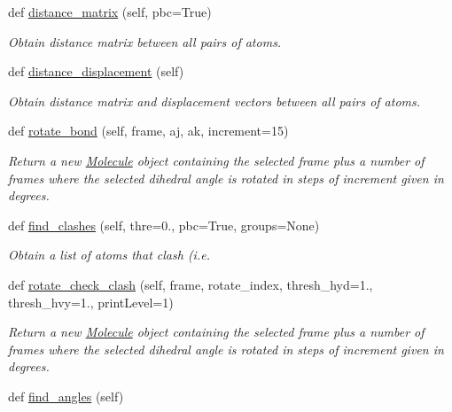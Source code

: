 \begin{DoxyCompactItemize}
def \hyperlink{classsrc_1_1molecule_1_1Molecule_ac9ca356c6a6ea6d5b470d819ab473f84}{distance\+\_\+matrix} (self, pbc=True)
\begin{DoxyCompactList}\small\item\em Obtain distance matrix between all pairs of atoms. \end{DoxyCompactList}\item 
def \hyperlink{classsrc_1_1molecule_1_1Molecule_a29b2035c5e476fb22707d6c17eaf5e3e}{distance\+\_\+displacement} (self)
\begin{DoxyCompactList}\small\item\em Obtain distance matrix and displacement vectors between all pairs of atoms. \end{DoxyCompactList}\item 
def \hyperlink{classsrc_1_1molecule_1_1Molecule_ae8aa53ace87ec66daf8264b2add069c3}{rotate\+\_\+bond} (self, frame, aj, ak, increment=15)
\begin{DoxyCompactList}\small\item\em Return a new \hyperlink{classsrc_1_1molecule_1_1Molecule}{Molecule} object containing the selected frame plus a number of frames where the selected dihedral angle is rotated in steps of \textquotesingle{}increment\textquotesingle{} given in degrees. \end{DoxyCompactList}\item 
def \hyperlink{classsrc_1_1molecule_1_1Molecule_a201a811c87574b4e229880540e4e6ef9}{find\+\_\+clashes} (self, thre=0., pbc=True, groups=None)
\begin{DoxyCompactList}\small\item\em Obtain a list of atoms that \textquotesingle{}clash\textquotesingle{} (i.\+e. \end{DoxyCompactList}\item 
def \hyperlink{classsrc_1_1molecule_1_1Molecule_a011f4f4e9170d8f3c86adf61453142ce}{rotate\+\_\+check\+\_\+clash} (self, frame, rotate\+\_\+index, thresh\+\_\+hyd=1., thresh\+\_\+hvy=1., print\+Level=1)
\begin{DoxyCompactList}\small\item\em Return a new \hyperlink{classsrc_1_1molecule_1_1Molecule}{Molecule} object containing the selected frame plus a number of frames where the selected dihedral angle is rotated in steps of \textquotesingle{}increment\textquotesingle{} given in degrees. \end{DoxyCompactList}\item 
def \hyperlink{classsrc_1_1molecule_1_1Molecule_ac89b40e6c15282d3c685e80672a01cbf}{find\+\_\+angles} (self)

\end{DoxyCompactItemize}

